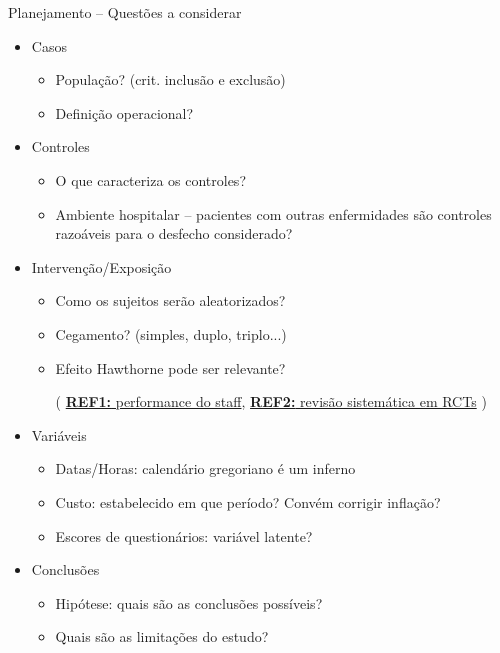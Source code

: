 \documentclass{beamer}
\begin{document}
\begin{frame}{Planejamento -- Questões a considerar}
  \begin{itemize}
    \footnotesize
  \item<1,2> Casos
    \begin{itemize}
      \scriptsize
    \item<2> População? (crit. inclusão e exclusão)
    \item<2> Definição operacional?
    \end{itemize}
  \item<1,3> Controles
    \scriptsize
    \begin{itemize}
      \scriptsize
    \item<3> O que caracteriza os controles?
    \item<3> Ambiente hospitalar -- pacientes com outras enfermidades são controles razoáveis para o desfecho considerado?
    \end{itemize}
  \item<1,4> Intervenção/Exposição
    \begin{itemize}
      \scriptsize
    \item<4> Como os sujeitos serão aleatorizados?
    \item<4> Cegamento? (simples, duplo, triplo...)
    \item<4> Efeito Hawthorne pode ser relevante?

      ({\tiny
        \href{https://doi.org/10.1001/jamainternmed.2016.9685}
        {{\bf REF1:} performance do staff},
        \href{https://doi.org/10.1016/j.jclinepi.2013.08.015}
        {{\bf REF2:} revisão sistemática em RCTs}
      })
    \end{itemize}
  \item<1,5> Variáveis
    \begin{itemize}
      \scriptsize
    \item<5> Datas/Horas: calendário gregoriano é um inferno
    \item<5> Custo: estabelecido em que período? Convém corrigir inflação?
    \item<5> Escores de questionários: variável latente?
    \end{itemize}
  \item<1,6> Conclusões
    \begin{itemize}
      \scriptsize
    \item<6> Hipótese: quais são as conclusões possíveis?
    \item<6> Quais são as limitações do estudo?
    \end{itemize}
  \end{itemize}
\end{frame}
\end{document}
